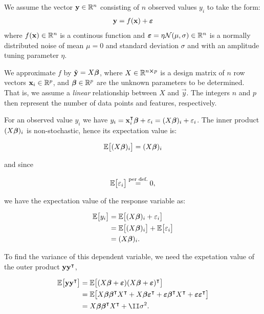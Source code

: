 We assume the vector $\vec{y} \in \RR[n]$ consisting of $n$ observed values $y_i$ to take the form:
\begin{align*}
    \vec{y}=f(\vec{x})+\svec{\epsilon}
\end{align*} where $f(\vec{x})\in\RR[n]$ is a continous function and $\svec{\epsilon}=\eta\mathcal{N}(\mu,\sigma)\in \RR[n] $ is a normally distributed noise of mean $\mu=0$ and standard deviation $\sigma$ and with an amplitude tuning parameter $\eta$. 

We approximate $f$ by $\tilde{\vec{y}}=X\svec{\beta}$, where $X\in \RR[n\cross p]$ is a design matrix of $n$ row vectors $\vec{x}_i\in \RR[p]$, and $\svec{\beta}\in \RR[p]$ are the unknown parameters to be determined. That is, we assume a \textit{linear} relationship between $X$ and $\vec{y}$. The integers $n$ and $p$ then represent the number of data points and features, respectively. 

For an observed value $y_i$ we have $y_i = \vec{x}_i\TT \svec{\beta} + \epsilon_i = \Xbi+ \epsilon_i$. The inner product $\Xbi$ is non-stochastic, hence its expectation value is:

\begin{align*}
    \EE{\Xbi} = \Xbi
\end{align*}

and since 

\begin{align*}
    \EE{\epsilon_i} \stackrel{\text{per def.}}{=} 0,
\end{align*}

we have the expectation value of the response variable as:

\begin{align*}
    \EE{y_i} &= \EE{\Xbi+ \epsilon_i} \\
    &= \EE{\Xbi} + \EE{\epsilon_i} \\
    &= \Xbi.
\end{align*}

To find the variance of this dependent variable, we need the expetation value of the outer product $\vec{y}\vec{y}\TT$,

\begin{align}
    \EE{\vec{y} \vec{y}\TT} &= \EE{(X\svec{\beta} + \svec{\epsilon})(X\svec{\beta} + \svec{\epsilon})\TT} \nonumber\\
    &= \EE{\Xb \svec{\beta}\TT X\TT + \Xb \svec{\epsilon}\TT + \svec{\epsilon}\svec{\beta}\TT X\TT + \svec{\epsilon} \svec{\epsilon}\TT} \nonumber \\
    &= \Xb \svec{\beta}\TT X\TT + \II \sigma^2. \label{eq:expectation_yyT}
\end{align}

